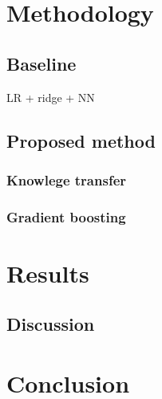 \documentclass{article}
\begin{document}
\section{Methodology}


\subsection{Baseline}
LR + ridge + NN

\subsection{Proposed method}

\subsubsection{Knowlege transfer}

\subsubsection{Gradient boosting}

\section{Results}

\subsection{Discussion}

\section{Conclusion}

\footnotesize{
\begin{spacing}{.85 }


\end{spacing}
}
\end{document}
